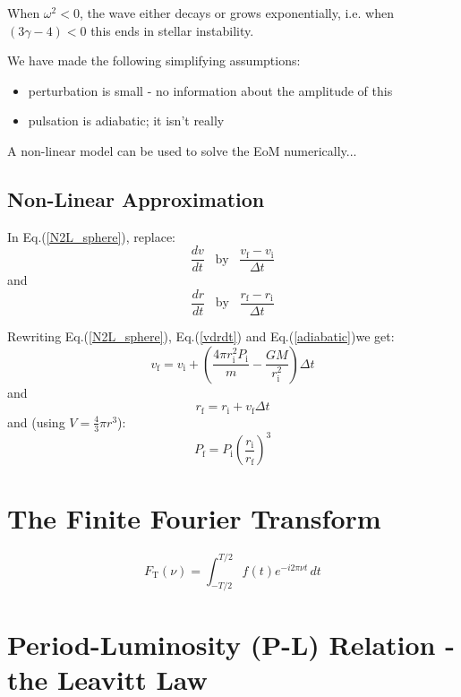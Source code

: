 \documentclass{spy}
\begin{document}
When \(\omega^2 < 0\), the wave either decays or grows exponentially, i.e. when \((3\gamma - 4) < 0\) this ends in stellar instability.  

We have made the following simplifying assumptions:
\begin{itemize}
    \item perturbation is small - no information about the amplitude of this
    \item pulsation is adiabatic; it isn't really
\end{itemize}

A non-linear model can be used to solve the EoM numerically...

\subsection{Non-Linear Approximation}
In Eq.(\ref{N2L_sphere}), replace:
\begin{equation}
    \frac{dv}{dt} \;\;\; \text{by}  \;\;\; \frac{v_\mathrm{f} - v_\mathrm{i}}{\Delta t}
\end{equation}
and
\begin{equation}
     \frac{dr}{dt} \;\;\; \text{by}  \;\;\; \frac{r_\mathrm{f} - r_\mathrm{i}}{\Delta t}
\end{equation}

Rewriting Eq.(\ref{N2L_sphere}), Eq.(\ref{vdrdt}) and Eq.(\ref{adiabatic})we get:
\begin{equation}
     v_\mathrm{f} = v_\mathrm{i} + \left(\frac{4\pi r^2_\mathrm{i} P_\mathrm{i}}{m} - \frac{GM}{r^2_\mathrm{i}}\right) \Delta t
\end{equation}
and
\begin{equation}
     r_\mathrm{f} = r_\mathrm{i} + v_\mathrm{f} \Delta t
\end{equation}
and (using \(V = \frac{4}{3} \pi r^3\)):
\begin{equation}
     P_\mathrm{f} = P_\mathrm{i} \left(\frac{r_\mathrm{i}}{r_\mathrm{f}} \right)^3
\end{equation}


\section{The Finite Fourier Transform}
\begin{equation}
F_\mathrm{T}(\nu) = \int_{-T/2}^{T/2} f(t)e^{-i 2\pi \nu t} \,dt
\end{equation}

\section{Period-Luminosity (P-L) Relation - the Leavitt Law}
\end{document}
